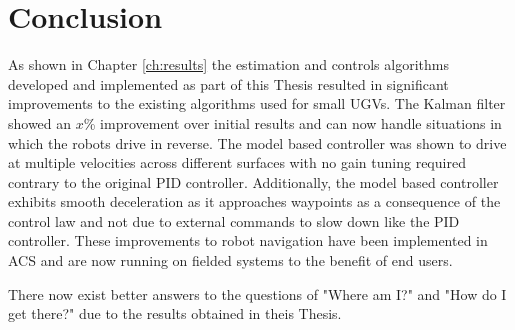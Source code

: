 \chapter{Conclusion}
\label{ch:conclusion}
As shown in Chapter \ref{ch:results} the estimation and controls algorithms developed and implemented as part of this Thesis resulted in significant improvements to the existing algorithms used for small UGVs. The Kalman filter showed an $x$\% improvement over initial results and can now handle situations in which the robots drive in reverse. The model based controller was shown to drive at multiple velocities across different surfaces with no gain tuning required contrary to the original PID controller. Additionally, the model based controller exhibits smooth deceleration as it approaches waypoints as a consequence of the control law and not due to external commands to slow down like the PID controller. These improvements to robot navigation have been implemented in ACS and are now running on fielded systems to the benefit of end users.

There now exist better answers to the questions of "Where am I?" and "How do I get there?" due to the results obtained in theis Thesis.
